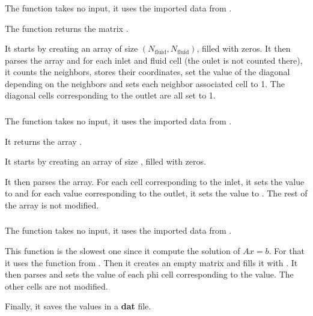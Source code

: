 \subsubsection{\textcolor{func}{}}
The function \textcolor{func}{} takes no input, it uses the imported data from
.

The function returns the matrix .

It starts by creating an array  of size
$(N_{\text{fluid}}, N_{\text{fluid}})$, filled with zeros. It then
parses the array  and for each inlet and fluid cell (the oulet
is not counted there), it counts the neighbors, stores their coordinates,
set the value of the diagonal depending on the neighbors and sets each
neighbor associated cell to 1. The diagonal cells corresponding to the outlet
are all set to 1.

\subsubsection{\textcolor{func}{}}
The function \textcolor{func}{} takes no input, it uses the
imported data from .

It returns the array .

It starts by creating an array  of size
, filled with zeros.

It then parses the array. For each cell corresponding to the inlet, it sets the
value to  and for each value corresponding to the outlet, it sets
the value to . The rest of the array is not modified.

\subsubsection{\textcolor{func}{}}
The function \textcolor{func}{} takes no input, it uses the
imported data from .

This function is the slowest one since it compute the solution of $Ax = b$. For
that it uses the function  from . Then it creates
an empty matrix  and fills it with . It then parses
 and sets the value of each phi cell corresponding to the  value.
The other cells are not modified.

Finally, it saves the values in a \textbf{dat} file.

